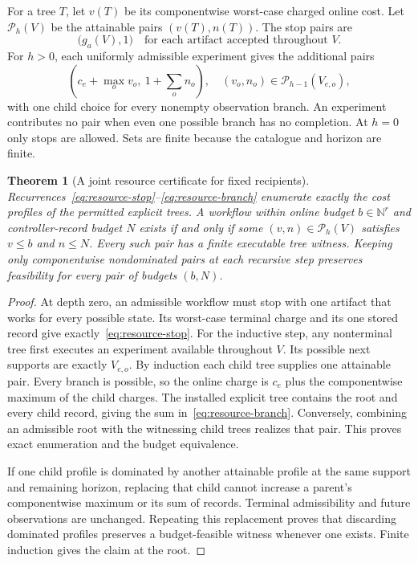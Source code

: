 \documentclass[11pt,letterpaper]{article}
\theoremstyle{plain}
\newtheorem{theorem}{Theorem}[section]
\theoremstyle{definition}
\begin{document}
For a tree $T$, let $v(T)$ be its componentwise worst-case charged online cost. Let $\mathcal P_h(V)$ be the attainable pairs $(v(T),n(T))$. The stop pairs are
\begin{equation}\label{eq:resource-stop}
\bigl(g_a(V),1\bigr)\quad\text{for each artifact accepted throughout }V.
\end{equation}
For $h>0$, each uniformly admissible experiment gives the additional pairs
\begin{equation}\label{eq:resource-branch}
\left(c_e+\max_o v_o,\ 1+\sum_o n_o\right),
\quad (v_o,n_o)\in\mathcal P_{h-1}(V_{e,o}),
\end{equation}
with one child choice for every nonempty observation branch. An experiment contributes no pair when even one possible branch has no completion. At $h=0$ only stops are allowed. Sets are finite because the catalogue and horizon are finite.

\begin{theorem}[A joint resource certificate for fixed recipients]\label{thm:resource-synthesis}
Recurrences~\eqref{eq:resource-stop}--\eqref{eq:resource-branch} enumerate exactly the cost profiles of the permitted explicit trees. A workflow within online budget $b\in\mathbb N^r$ and controller-record budget $N$ exists if and only if some $(v,n)\in\mathcal P_h(V)$ satisfies $v\leq b$ and $n\leq N$. Every such pair has a finite executable tree witness. Keeping only componentwise nondominated pairs at each recursive step preserves feasibility for every pair of budgets $(b,N)$.
\end{theorem}
\begin{proof}
At depth zero, an admissible workflow must stop with one artifact that works for every possible state. Its worst-case terminal charge and its one stored record give exactly~\eqref{eq:resource-stop}. For the inductive step, any nonterminal tree first executes an experiment available throughout $V$. Its possible next supports are exactly $V_{e,o}$. By induction each child tree supplies one attainable pair. Every branch is possible, so the online charge is $c_e$ plus the componentwise maximum of the child charges. The installed explicit tree contains the root and every child record, giving the sum in~\eqref{eq:resource-branch}. Conversely, combining an admissible root with the witnessing child trees realizes that pair. This proves exact enumeration and the budget equivalence.

If one child profile is dominated by another attainable profile at the same support and remaining horizon, replacing that child cannot increase a parent's componentwise maximum or its sum of records. Terminal admissibility and future observations are unchanged. Repeating this replacement proves that discarding dominated profiles preserves a budget-feasible witness whenever one exists. Finite induction gives the claim at the root.
\end{proof}
\end{document}
